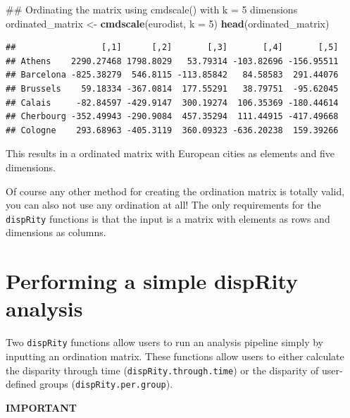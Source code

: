 \documentclass[]{book}
\newenvironment{Shaded}{\begin{snugshade}}{\end{snugshade}}
\newcommand{\KeywordTok}[1]{\textcolor[rgb]{0.13,0.29,0.53}{\textbf{#1}}}
\newcommand{\DataTypeTok}[1]{\textcolor[rgb]{0.13,0.29,0.53}{#1}}
\newcommand{\DecValTok}[1]{\textcolor[rgb]{0.00,0.00,0.81}{#1}}
\newcommand{\StringTok}[1]{\textcolor[rgb]{0.31,0.60,0.02}{#1}}
\newcommand{\NormalTok}[1]{#1}
\theoremstyle{definition}
\theoremstyle{definition}
\theoremstyle{remark}
\begin{document}
\begin{Shaded}
\begin{Highlighting}[]
\NormalTok{## Ordinating the matrix using cmdscale() with k = 5 dimensions }
\NormalTok{ordinated_matrix <-}\StringTok{ }\KeywordTok{cmdscale}\NormalTok{(eurodist, }\DataTypeTok{k =} \DecValTok{5}\NormalTok{)}
\KeywordTok{head}\NormalTok{(ordinated_matrix)}
\end{Highlighting}
\end{Shaded}

\begin{verbatim}
##                 [,1]      [,2]       [,3]       [,4]       [,5]
## Athens    2290.27468 1798.8029   53.79314 -103.82696 -156.95511
## Barcelona -825.38279  546.8115 -113.85842   84.58583  291.44076
## Brussels    59.18334 -367.0814  177.55291   38.79751  -95.62045
## Calais     -82.84597 -429.9147  300.19274  106.35369 -180.44614
## Cherbourg -352.49943 -290.9084  457.35294  111.44915 -417.49668
## Cologne    293.68963 -405.3119  360.09323 -636.20238  159.39266
\end{verbatim}

This results in a ordinated matrix with European cities as elements and
five dimensions.

Of course any other method for creating the ordination matrix is totally
valid, you can also not use any ordination at all! The only requirements
for the \texttt{dispRity} functions is that the input is a matrix with
elements as rows and dimensions as columns.

\section{Performing a simple dispRity analysis}\label{simpleanalysis}

Two \texttt{dispRity} functions allow users to run an analysis pipeline
simply by inputting an ordination matrix. These functions allow users to
either calculate the disparity through time
(\texttt{dispRity.through.time}) or the disparity of user-defined groups
(\texttt{dispRity.per.group}).

\textbf{IMPORTANT}
\end{document}
